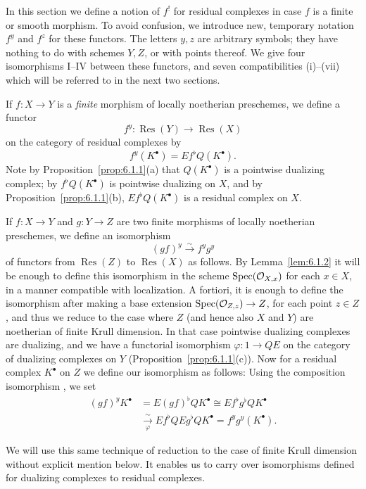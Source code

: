 In this section we define a notion of $f^{!}$ for residual complexes in case $f$ is a finite or smooth morphism. To avoid confusion, we introduce new, temporary notation $f^{y}$ and $f^{z}$ for these functors. The letters $y,z$ are arbitrary symbols; they have nothing to do with schemes $Y,Z$, or with points thereof. We give four isomorphisms I--IV between these functors, and seven compatibilities (i)--(vii) which will be referred to in the next two sections.

If $f\colon X\to Y$ is a \emph{finite} morphism of locally noetherian preschemes, we define a functor
\[
f^{y}\colon \operatorname{Res}(Y)\longrightarrow \operatorname{Res}(X)
\]
on the category of residual complexes by
\[
f^{y}(K^{\bullet}) = Ef^{\flat} Q(K^{\bullet}).
\]
Note by Proposition~\ref{prop:6.1.1}(a) that $Q(K^\bullet)$ is a pointwise dualizing complex; by  $f^{\flat}Q(K^\bullet)$ is pointwise dualizing on $X$, and by Proposition~\ref{prop:6.1.1}(b), $Ef^{\flat}Q(K^\bullet)$ is a residual complex on $X$.

If $f\colon X\to Y$ and $g\colon Y\to Z$ are two finite morphisms of locally noetherian preschemes, we define an isomorphism
\[
(gf)^{y} \xrightarrow{\sim} f^{y}g^{y} \tag{I}\label{eq:6.2.I}
\]
of functors from $\operatorname{Res}(Z)$ to $\operatorname{Res}(X)$ as follows. By Lemma~\ref{lem:6.1.2} it will be enough to define this isomorphism in the scheme $\operatorname{Spec}(\mathcal{O}_{X,x})$ for each $x\in X$, in a manner compatible with localization. A fortiori, it is enough to define the isomorphism after making a base extension $\operatorname{Spec}(\mathcal{O}_{Z,z})\to Z$, for each point $z\in Z$, and thus we reduce to the case where $Z$ (and hence also $X$ and $Y$) are noetherian of finite Krull dimension. In that case pointwise dualizing complexes are dualizing, and we have a functorial isomorphism $\varphi\colon 1\to QE$ on the category of dualizing complexes on $Y$ (Proposition~\ref{prop:6.1.1}(c)). Now for a residual complex $K^\bullet$ on $Z$ we define our isomorphism as follows:
Using the composition isomorphism , we set
\[
\begin{aligned}
(gf)^yK^\bullet
 &= E(gf)^\flat QK^\bullet
  \cong Ef^\flat g^\flat QK^\bullet \\
 &\xrightarrow[\varphi]{\sim} Ef^\flat QE g^\flat QK^\bullet
  = f^y g^y(K^\bullet).
\end{aligned}
\]

We will use this same technique of reduction to the case of finite Krull dimension without explicit mention below. It enables us to carry over isomorphisms defined for dualizing complexes to residual complexes.

